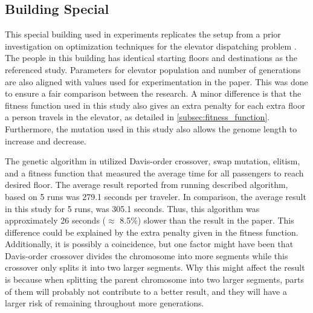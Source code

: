 \newpage

\subsection{Building Special}
This special building used in experiments replicates the setup from a prior investigation on optimization techniques for the elevator dispatching problem \cite{gharieb2005optimal}. The people in this building has identical starting floors and destinations as the referenced study. Parameters for elevator population and number of generations are also aligned with values used for experimentation in the paper. This was done to ensure a fair comparison between the research. A minor difference is that the fitness function used in this study also gives an extra penalty for each extra floor a person travels in the elevator, as detailed in \ref{subsec:fitness_function}. Furthermore, the mutation used in this study also allows the genome length to increase and decrease.

The genetic algorithm in \cite{gharieb2005optimal} utilized Davis-order crossover, swap mutation, elitism, and a fitness function that measured the average time for all passengers to reach desired floor. The average result reported from running described algorithm, based on 5 runs was 279.1 seconds per traveler. In comparison, the average result in this study for 5 runs, was 305.1 seconds. Thus, this algorithm was approximately 26 seconds ($\approx$ 8.5\%) slower than the result in the paper. This difference could be explained by the extra penalty given in the fitness function. Additionally, it is possibly a coincidence, but one factor might have been that Davis-order crossover divides the chromosome into more segments while this crossover only splits it into two larger segments. Why this might affect the result is because when splitting the parent chromosome into two larger segments, parts of them will probably not contribute to a better result, and they will have a larger risk of remaining throughout more generations.
